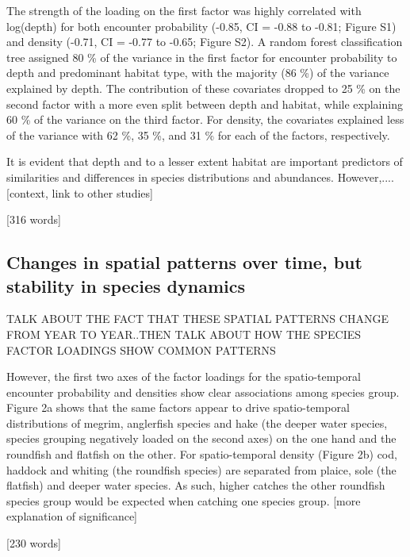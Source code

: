 \documentclass{nature}
\begin{document}
\begin{linenumbers}
The strength of the loading on the first factor was highly correlated with
log(depth) for both encounter probability (-0.85, CI = -0.88 to -0.81; Figure
S1) and density (-0.71, CI = -0.77 to -0.65; Figure S2). A random forest
classification tree assigned 80 \% of the variance in the first factor for
encounter probability to depth and predominant habitat type, with the majority
(86 \%) of the variance explained by depth. The contribution of these
covariates dropped to 25 \% on the second factor with a more even split between
depth and habitat, while explaining 60 \% of the variance on the third factor.
For density, the covariates explained less of the variance with 62 \%, 35 \%,
and 31 \% for each of the factors, respectively.

It is evident that depth and to a lesser extent habitat are important
predictors of similarities and differences in species distributions and
abundances. However,.... [context, link to other studies]

[316 words]

\subsection{Changes in spatial patterns over time, but stability in species
	dynamics}

TALK ABOUT THE FACT THAT THESE SPATIAL PATTERNS CHANGE FROM YEAR TO YEAR..THEN
TALK ABOUT HOW THE SPECIES FACTOR LOADINGS SHOW COMMON PATTERNS

However, the first two axes of the factor loadings for the spatio-temporal
encounter probability and densities show clear associations among species
group. Figure 2a shows that the same factors appear to drive spatio-temporal
distributions of megrim, anglerfish species and hake (the deeper water species,
species grouping negatively loaded on the second axes) on the one hand and the
roundfish and flatfish on the other. For spatio-temporal density (Figure 2b)
cod, haddock and whiting (the roundfish species) are separated from plaice,
sole (the flatfish) and deeper water species. As such, higher catches the other
roundfish species group would be expected when catching one species group.
[more explanation of significance]

[230 words]


\end{linenumbers}
\end{document}
